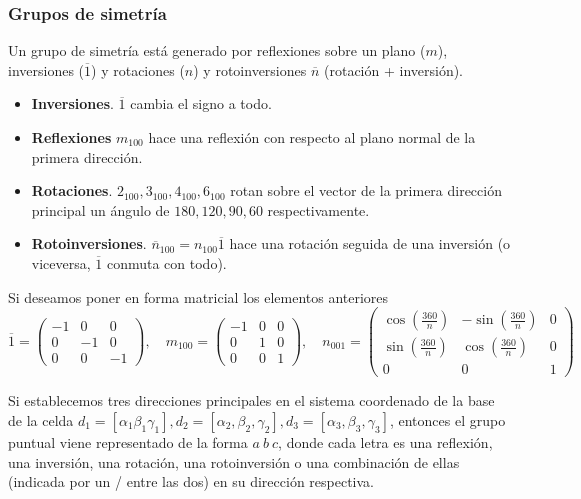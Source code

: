 \documentclass[leqno]{article}
\begin{document}
\subsubsection{Grupos de simetría}
Un grupo de simetría está generado por reflexiones sobre un plano ($m$), inversiones ($\overline{1}$) y rotaciones ($n$) y rotoinversiones $\overline{n}$ (rotación + inversión).

\begin{itemize}[topsep=-6pt, itemsep=0pt]
  \item \textbf{Inversiones}. $\overline{1}$ cambia el signo a todo.   
  \item \textbf{Reflexiones} $m_{100}$ hace una reflexión con respecto al plano normal de la primera dirección. 
  \item  \textbf{Rotaciones}. $2_{100}, 3_{100}, 4_{100}, 6_{100}$ rotan sobre el vector de la primera dirección principal un ángulo de $180, 120, 90, 60$ respectivamente.
  \item  \textbf{Rotoinversiones}. $\overline{n}_{100} = n_{100}\overline{1}$ hace una rotación seguida de una inversión (o viceversa, $\overline{1}$ conmuta con todo).
\end{itemize}

Si deseamos poner en forma matricial los elementos anteriores
\[
  \overline{1} = \begin{pmatrix} -1&0&0\\0&-1&0\\0&0&-1 \end{pmatrix} , \quad
  m_{100} = \begin{pmatrix} -1&0&0\\0&1&0\\0&0&1 \end{pmatrix} , \quad
  n_{001} = \begin{pmatrix} \cos\left( \frac{360}{n} \right) &-\sin\left( \frac{360}{n} \right) &0\\ \sin\left( \frac{360}{n} \right) &\cos\left( \frac{360}{n} \right) &0\\0&0&1 \end{pmatrix}
\] 

Si establecemos tres direcciones principales en el sistema coordenado de la base de la celda  $d_1=[\alpha _1 \beta _1 \gamma_1], d_2=[\alpha_2, \beta_2, \gamma_2], d_3 = [\alpha _3, \beta _3, \gamma_3]$, entonces el grupo puntual viene representado de la forma $a \ b\ c$, donde cada letra es  una reflexión, una inversión, una rotación, una rotoinversión o una combinación de ellas (indicada por un / entre las dos) en su dirección respectiva.
\end{document}
